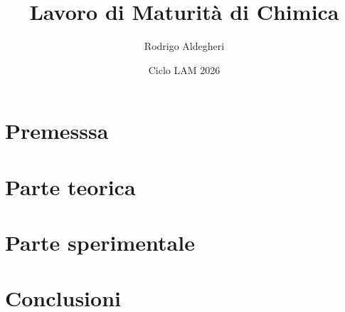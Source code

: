 \documentclass[onesided, a4paper]{book} %
\title{Lavoro di Maturità di Chimica}
\author{Rodrigo Aldegheri}
\date{Ciclo LAM 2026}
\begin{document}
\maketitle
\tableofcontents

\chapter{Premesssa}

\chapter{Parte teorica}

\chapter{Parte sperimentale}

\chapter{Conclusioni}






\end{document}
